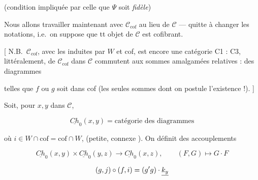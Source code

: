 \documentclass[11pt,a4paper]{article}
\begin{document}
(condition impliquée par celle que $\Psi$ soit \emph{fidèle})

Nous allons travailler maintenant avec $\mathcal{C}_{\mathrm{cof}}$ au lieu de
$\mathcal{C}$ —  quitte à changer les notations, i.e.\ on suppose
que tt objet de $\mathcal{C}$ est cofibrant.

[ N.B.\ $\mathcal{C}_{\mathrm{cof}}$, avec les \ill{} induites par $W$ et cof,
est encore une catégorie  C1 : C3, littéralement,
\ill{} de $\mathcal{C}_{\mathrm{cof}}$ dans $\mathcal{C}$ commutent aux sommes
amalgamées  relatives : des diagrammes


telles que $f$ ou $g$ soit dans cof (les seules sommes dont on postule
l'existence !). ]

Soit, pour $x, y$ dans $\mathcal{C}$,

\[
\underline{Ch}_0(x,y) = \text{catégorie des diagrammes}
\]


où $i \in W \cap \mathrm{cof} = \mathrm{cof} \cap W$, 
(petite, connexe \ill{}). On définit des accouplements

\[
\underline{Ch}_0(x,y) \times \underline{Ch}_0(y,z) \longrightarrow
\underline{Ch}_0(x,z),
\qquad (F, G) \longmapsto G \cdot F
\]



\[
(g,j) \circ (f,i) = (g'g) \cdot \uncertain{k_y}
\]

\end{document}
